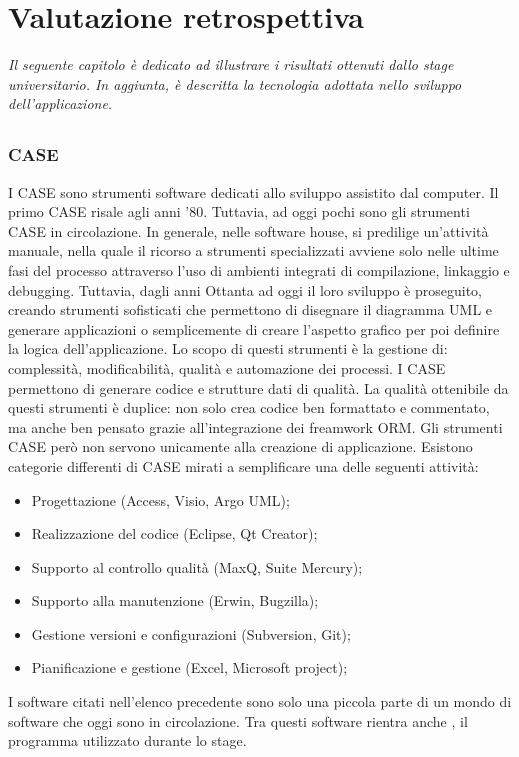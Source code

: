 \chapter{Valutazione retrospettiva}
\textit{Il seguente capitolo è dedicato ad illustrare i risultati ottenuti dallo stage universitario. In aggiunta, è descritta la tecnologia adottata nello sviluppo dell'applicazione.}

\section{\inde}

\subsection{CASE}
I CASE sono strumenti software dedicati allo sviluppo assistito dal computer. Il primo CASE risale agli anni '80. Tuttavia, ad oggi pochi sono gli strumenti CASE in circolazione. In generale, nelle software house, si predilige un'attività manuale, nella quale il ricorso a strumenti specializzati avviene solo nelle ultime fasi del processo attraverso l'uso di ambienti integrati di compilazione, linkaggio e debugging.
Tuttavia, dagli anni Ottanta ad oggi il loro sviluppo è proseguito, creando strumenti sofisticati che permettono di disegnare il diagramma UML e generare applicazioni o semplicemente di creare l'aspetto grafico per poi definire la logica dell'applicazione.
Lo scopo di questi strumenti è la gestione di: complessità, modificabilità, qualità e automazione dei processi. I CASE permettono di generare codice e strutture dati di qualità. La qualità ottenibile da questi strumenti è duplice: non solo crea codice ben formattato e commentato, ma anche ben pensato grazie all'integrazione dei freamwork ORM.
Gli strumenti CASE però non servono unicamente alla creazione di applicazione. Esistono categorie differenti di CASE mirati a semplificare una delle seguenti attività:
\begin{itemize}
	\item Progettazione (Access, Visio, Argo UML);
	\item Realizzazione del codice (Eclipse, Qt Creator);
	\item Supporto al controllo qualità (MaxQ, Suite Mercury);
	\item Supporto alla manutenzione (Erwin, Bugzilla);
	\item Gestione versioni e configurazioni (Subversion, Git);
	\item Pianificazione e gestione (Excel, Microsoft project);
\end{itemize}
I software citati nell'elenco precedente sono solo una piccola parte di un mondo di software che oggi sono in circolazione. Tra questi software rientra anche \inde, il programma utilizzato durante lo stage. 




